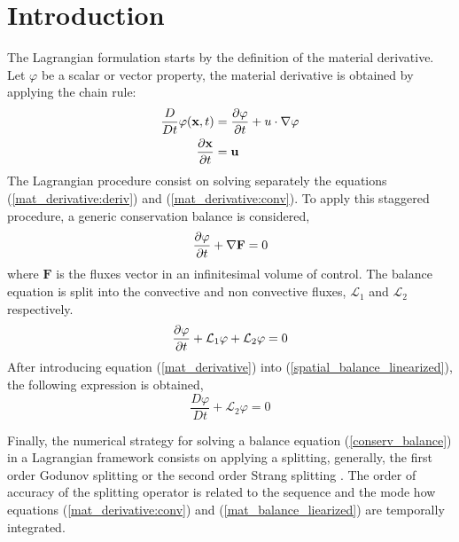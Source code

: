 \section{Introduction}

The Lagrangian formulation starts by the definition of the material derivative. Let $\varphi$ be a scalar or vector property, the material derivative is obtained by applying the chain rule:
\begin{subequations} \label{mat_derivative}
\begin{align}
\frac{D}{Dt}\varphi(\mathbf{x},t) &= \frac{\partial\varphi}{\partial t} + u\cdot\nabla\varphi \label{mat_derivative:deriv} \\
\frac{\partial\mathbf{x}}{\partial t} &= \mathbf{u} \label{mat_derivative:conv}
\end{align}
\end{subequations}
The Lagrangian procedure consist on solving separately the equations (\ref{mat_derivative:deriv}) and (\ref{mat_derivative:conv}). To apply this staggered procedure, a generic conservation balance is considered,
\begin{equation} \label{conserv_balance}
\frac{\partial\varphi}{\partial t} + \nabla \mathbf{F} = 0
\end{equation}
where $\mathbf{F}$ is the fluxes vector in an infinitesimal volume of control. The balance equation is split into the convective and non convective fluxes, $\mathcal{L}_1$ and $\mathcal{L}_2$ respectively.
\begin{equation} \label{spatial_balance_linearized}
    \frac{\partial\varphi}{\partial t} + \mathcal{L}_1 \varphi + \mathcal{L}_2 \varphi = 0
\end{equation}
After introducing equation (\ref{mat_derivative}) into (\ref{spatial_balance_linearized}), the following expression is obtained,
\begin{equation} \label{mat_balance_liearized}
    \frac{D\varphi}{Dt} + \mathcal{L}_2 \varphi = 0
\end{equation}

Finally, the numerical strategy for solving a balance equation (\ref{conserv_balance}) in a Lagrangian framework consists on applying a splitting, generally, the first order Godunov splitting \cite{leveque2002} or the second order Strang splitting \cite{macnamara2016}.
The order of accuracy of the splitting operator is related to the sequence and the mode how equations (\ref{mat_derivative:conv}) and (\ref{mat_balance_liearized}) are temporally integrated.





